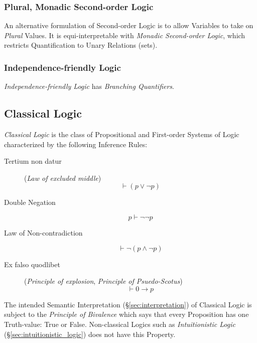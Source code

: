 \subsubsection{Plural, Monadic Second-order Logic}
\label{sec:monadic_second_order}

An alternative formulation of Second-order Logic is to allow Variables
to take on \emph{Plural} Values. It is equi-interpretable with
\emph{Monadic Second-order Logic}, which restricts Quantification to
Unary Relations (sets).

\subsubsection{Independence-friendly Logic}\label{sec:independence_logic}

\emph{Independence-friendly Logic} has \emph{Branching Quantifiers}.

\subsection{Classical Logic}\label{sec:classical_logic}

\emph{Classical Logic} is the class of Propositional and
First-order Systems of Logic characterized by the following Inference
Rules:

\begin{description}

\item [Tertium non datur] (\emph{Law of excluded middle})
    \[\vdash(p \vee \neg p)\]

\item [Double Negation]
    \[p \vdash \neg\neg p\]

\item [Law of Non-contradiction]
    \[\vdash \neg(p \wedge \neg p)\]

\item [Ex falso quodlibet] (\emph{Principle of explosion},
  \emph{Principle of Psuedo-Scotus})
    \[\vdash 0 \rightarrow p\]


\end{description}

The intended Semantic Interpretation (\S\ref{sec:interpretation})
of Classical Logic is subject to the \emph{Principle of Bivalence}
which says that every Proposition has one Truth-value: True or False.
Non-classical Logics such as \emph{Intuitionistic Logic}
(\S\ref{sec:intuitionistic_logic}) does not have this Property.

